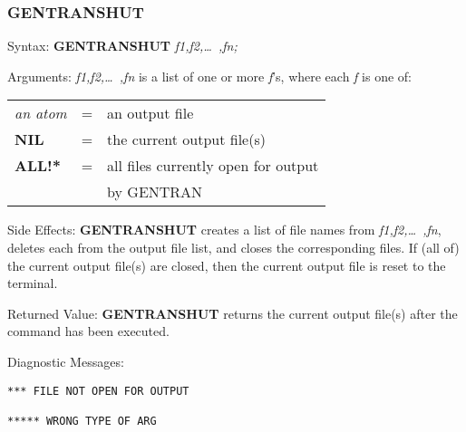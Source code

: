 \subsubsection{GENTRANSHUT}
\begin{describe}{Syntax:}
{\bf GENTRANSHUT} {\it  f1,f2,\dots\ ,fn;\/}
\end{describe}
\begin{describe}{Arguments:}
{\it f1,f2,\dots\ ,fn\/} is a list of one or more {\it f\/}'s, where each
{\it f\/} is one of:
\begin{center}
\begin{tabular}{lll}
{\it an atom} & = & an output file\\
{\bf NIL} & = & the current output file(s)\\
{\bf ALL!*} & = & all files currently open for output \\
& & by GENTRAN\\
\end{tabular}
\end{center}
\end{describe}
\begin{describe}{Side Effects:}
{\bf GENTRANSHUT} creates a list of file names from {\it f1,f2,\dots\ ,fn},
deletes each from the output file list, and closes the
corresponding files.  If (all of) the current output file(s) are
closed, then the current output file is reset to the terminal.
\end{describe}
\begin{describe}{Returned Value:}
{\bf GENTRANSHUT} returns the current output file(s) after the command has
been executed.
\end{describe}
\begin{describe}{Diagnostic Messages:}
\begin{verbatim}
*** FILE NOT OPEN FOR OUTPUT

***** WRONG TYPE OF ARG
\end{verbatim}
\end{describe}
